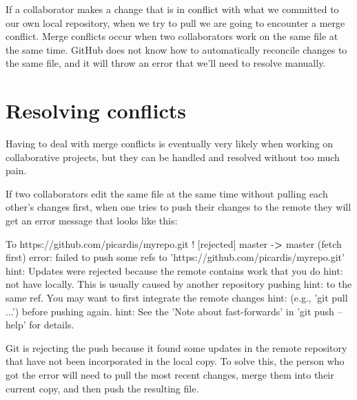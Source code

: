 \documentclass[
]{book}
\newenvironment{Shaded}{\begin{snugshade}}{\end{snugshade}}
\newcommand{\ExtensionTok}[1]{#1}
\newcommand{\NormalTok}[1]{#1}
\newcommand{\OperatorTok}[1]{\textcolor[rgb]{0.81,0.36,0.00}{\textbf{#1}}}
\newcommand{\StringTok}[1]{\textcolor[rgb]{0.31,0.60,0.02}{#1}}
\begin{document}
If a collaborator makes a change that is in conflict with what we committed to our own local repository, when we try to pull we are going to encounter a merge conflict. Merge conflicts occur when two collaborators work on the same file at the same time. GitHub does not know how to automatically reconcile changes to the same file, and it will throw an error that we'll need to resolve manually.

\hypertarget{resolving-conflicts}{%
\section{Resolving conflicts}\label{resolving-conflicts}}

Having to deal with merge conflicts is eventually very likely when working on collaborative projects, but they can be handled and resolved without too much pain.

If two collaborators edit the same file at the same time without pulling each other's changes first, when one tries to push their changes to the remote they will get an error message that looks like this:

\begin{Shaded}
\begin{Highlighting}[]
\ExtensionTok{To}\NormalTok{ https://github.com/picardis/myrepo.git}
\NormalTok{ ! [}\ExtensionTok{rejected}\NormalTok{]        master -}\OperatorTok{>}\NormalTok{ master (fetch first)}
\ExtensionTok{error}\NormalTok{: failed to push some refs to }\StringTok{'https://github.com/picardis/myrepo.git'}
\ExtensionTok{hint}\NormalTok{: Updates were rejected because the remote contains work that you do}
\ExtensionTok{hint}\NormalTok{: not have locally. This is usually caused by another repository pushing}
\ExtensionTok{hint}\NormalTok{: to the same ref. You may want to first integrate the remote changes}
\ExtensionTok{hint}\NormalTok{: (e.g., }\StringTok{'git pull ...'}\NormalTok{) }\ExtensionTok{before}\NormalTok{ pushing again.}
\ExtensionTok{hint}\NormalTok{: See the }\StringTok{'Note about fast-forwards'}\NormalTok{ in }\StringTok{'git push --help'}\NormalTok{ for details.}
\end{Highlighting}
\end{Shaded}

Git is rejecting the push because it found some updates in the remote repository that have not been incorporated in the local copy. To solve this, the person who got the error will need to pull the most recent changes, merge them into their current copy, and then push the resulting file.
\end{document}
